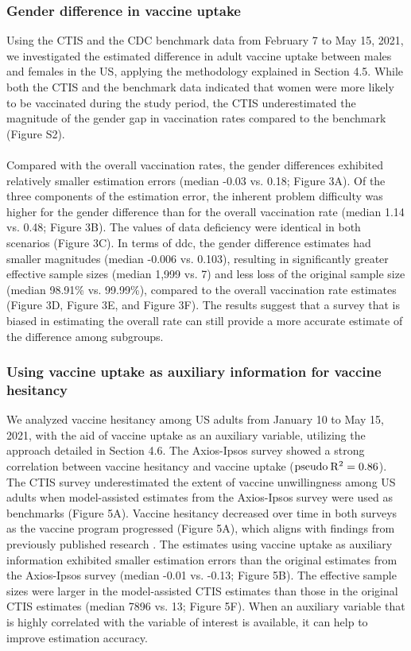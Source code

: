 \documentclass{article}
\begin{document}
\subsubsection{Gender difference in vaccine uptake}

Using the CTIS and the CDC benchmark data from February 7 to May 15, 2021, we investigated the estimated difference in adult vaccine uptake between males and females in the US, applying the methodology explained in Section 4.5. While both the CTIS and the benchmark data indicated that women were more likely to be vaccinated during the study period, the CTIS underestimated the magnitude of the gender gap in vaccination rates compared to the benchmark (Figure S2). 
\\
\\
Compared with the overall vaccination rates, the gender differences exhibited relatively smaller estimation errors (median -0.03 vs. 0.18; Figure 3A). Of the three components of the estimation error, the inherent problem difficulty was higher for the gender difference than for the overall vaccination rate (median 1.14 vs. 0.48; Figure 3B). The values of data deficiency were identical in both scenarios (Figure 3C). In terms of ddc, the gender difference estimates had smaller magnitudes (median -0.006 vs. 0.103), resulting in significantly greater effective sample sizes (median 1,999 vs. 7) and less loss of the original sample size (median 98.91\% vs. 99.99\%), compared to the overall vaccination rate estimates (Figure 3D, Figure 3E, and Figure 3F). The results suggest that a survey that is biased in estimating the overall rate can still provide a more accurate estimate of the difference among subgroups.

\subsubsection{Using vaccine uptake as auxiliary information for vaccine hesitancy}

We analyzed vaccine hesitancy among US adults from January 10 to May 15, 2021, with the aid of vaccine uptake as an auxiliary variable, utilizing the approach detailed in Section 4.6. The Axios-Ipsos survey showed a strong correlation between vaccine hesitancy and vaccine uptake ($\rm pseudo \: R^2 = 0.86$). The CTIS survey underestimated the extent of vaccine unwillingness among US adults when model-assisted estimates from the Axios-Ipsos survey were used as benchmarks (Figure 5A). Vaccine hesitancy decreased over time in both surveys as the vaccine program progressed (Figure 5A), which aligns with findings from previously published research \citep{Daly2021-xe}. The estimates using vaccine uptake as auxiliary information exhibited smaller estimation errors than the original estimates from the Axios-Ipsos survey (median -0.01 vs. -0.13; Figure 5B). The effective sample sizes were larger in the model-assisted CTIS estimates than those in the original CTIS estimates (median 7896 vs. 13; Figure 5F). When an auxiliary variable that is highly correlated with the variable of interest is available, it can help to improve estimation accuracy. 
\end{document}
